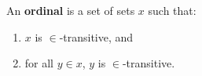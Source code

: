 An \textbf{ordinal} is a set of sets $x$ such that:
\begin{enumerate}
\item $x$ is $\in$-transitive, and
\item for all $y \in x$, $y$ is $\in$-transitive.
\end{enumerate}
